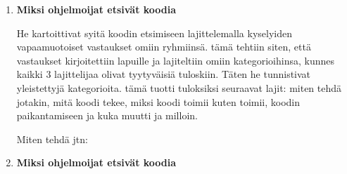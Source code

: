 \documentclass[finnish]{../tktltiki2}
\theoremstyle{definition}
\theoremstyle{remark}
\begin{document}
\begin{enumerate}

  \item {\bf Miksi ohjelmoijat etsivät koodia}

    He kartoittivat syitä koodin etsimiseen lajittelemalla kyselyiden vapaamuotoiset vastaukset omiin ryhmiinsä. tämä tehtiin siten, että vastaukset kirjoitettiin lapuille ja lajiteltiin omiin kategorioihinsa, kunnes kaikki 3 lajittelijaa olivat tyytyväisiä tuloskiin. Täten he tunnistivat yleistettyjä kategorioita.
    tämä tuotti tuloksiksi seuraavat lajit: miten tehdä jotakin, mitä koodi tekee, miksi koodi toimii kuten toimii, koodin paikantamiseen ja kuka muutti ja milloin.

    Miten tehdä jtn:




  \item {\bf Miksi ohjelmoijat etsivät koodia}
\end{enumerate}



%
%
% 
%







%
\end{document}
